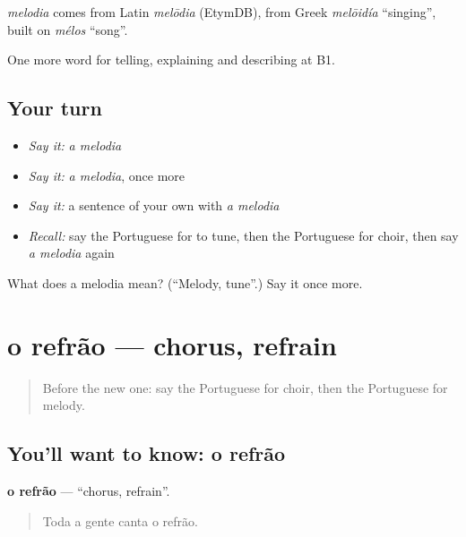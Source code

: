 \begin{cousinweb}
\emph{melodia} comes from Latin \emph{melōdia} (EtymDB), from Greek \emph{melōidía} \textquotedblleft{}singing\textquotedblright{}, built on \emph{mélos} \textquotedblleft{}song\textquotedblright{}.
\end{cousinweb}

\begin{grammarlens}[title={What you've built}]
One more word for telling, explaining and describing at B1.
\end{grammarlens}

\subsection*{Your turn}
\begin{itemize}
\raggedright
  \item \emph{Say it:} \emph{a melodia}
  \item \emph{Say it:} \emph{a melodia}, once more
  \item \emph{Say it:} a sentence of your own with \emph{a melodia}
  \item \emph{Recall:} say the Portuguese for to tune, then the Portuguese for choir, then say \emph{a melodia} again
\end{itemize}

\begin{tcolorbox}[breakable,colback=teal!4,colframe=teal!35!black,title={Before you move on}]
What does a melodia mean? (\textquotedblleft{}Melody, tune\textquotedblright{}.) Say it once more.
\end{tcolorbox}
\section[o refrão]{o refrão — chorus, refrain}

\label{lesson:PT-C518-refrao}



\begin{quote}
Before the new one: say the Portuguese for choir, then the Portuguese for melody.
\end{quote}

\subsection*{You'll want to know: o refrão}
\textbf{o refrão} — \textquotedblleft{}chorus, refrain\textquotedblright{}.

\begin{quote}
Toda a gente canta o refrão.
\end{quote}

